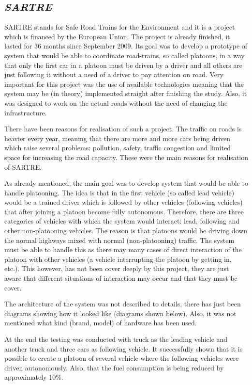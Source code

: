 \subsection{\textit{SARTRE}}

SARTRE \cite{Chan2012ProjectSARTRE} stands for Safe Road Trains for the Environment and it is a project which is financed by the European Union. The project is already finished, it lasted for 36 months since September 2009. Its goal was to develop a prototype of system that would be able to coordinate road-trains, so called platoons, in a way that only the first car in a platoon must be driven by a driver and all others are just following it without a need of a driver to pay attention on road. Very important for this project was the use of available technologies meaning that the system may be (in theory) implemented straight after finishing the study. Also, it was designed to work on the actual roads without the need of changing the infrastructure.\par
% 
There have been reasons for realisation of such a project. The traffic on roads is heavier every year, meaning that there are more and more cars being driven which raise several problems: pollution, safety, traffic congestion and limited space for increasing the road capacity. These were the main reasons for realisation of SARTRE. \par
% 
As already mentioned, the main goal was to develop system that would be able to handle platooning. The idea is that in the first vehicle (so called lead vehicle) would be a trained driver which is followed by other vehicles (following vehicles) that after joining a platoon become fully autonomous. Therefore, there are three categories of vehicles with which the system would interact: lead, following and other non-platooning vehicles. The reason is that platoons would be driving down the normal highways mixed with normal (non-platooning) traffic. The system must be able to handle this as there may many cases of direct interaction of the platoon with other vehicles (a vehicle interrupting the platoon by getting in, etc.). This however, has not been cover deeply by this project, they are just aware that different situations of interaction may occur and that they must be cover.\par
% 
The architecture of the system was not described to details, there has just been diagrams showing how it looked like (diagrams shown below). Also, it was not mentioned what kind (brand, model) of hardware has been used.\par
% 
At the end the testing was conducted with truck as the leading vehicle and another truck and three cars as following vehicle. It successfully shown that it is possible to create a platoon of several vehicle where the following vehicles were driven autonomously. Also, that the fuel consumption is being reduced by approximately 10\%.